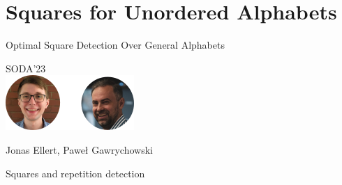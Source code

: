 
\section{Squares for Unordered Alphabets}
\newcommand{\absolute}[1]{\left\lvert#1\right\rvert}
\newcommand{\orderof}[1]{\mathcal{O}(#1)}

\begin{frame}
    \centering
    {\Large Optimal Square Detection  Over General Alphabets}
  
    \bigskip
    {\large SODA'23}\\
    \bigskip
    \includegraphics{pictures/mindmap/squares.png}
  
    \bigskip
    Jonas Ellert, Paweł Gawrychowski
  \end{frame}

\begin{frame}{Squares and repetition detection}

\end{frame}


